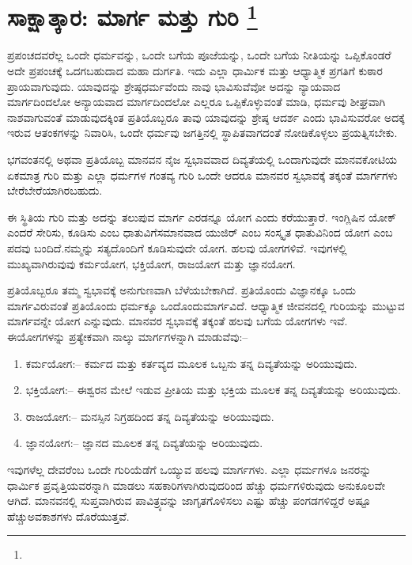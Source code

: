 
\vskip -0.5cm

\chapter[ಸಾಕ್ಷಾತ್ಕಾರ: ಮಾರ್ಗ ಮತ್ತು ಗುರಿ ]{ಸಾಕ್ಷಾತ್ಕಾರ: ಮಾರ್ಗ ಮತ್ತು ಗುರಿ \protect\footnote{}}

ಪ್ರಪಂಚದವರೆಲ್ಲ ಒಂದೇ ಧರ್ಮವನ್ನು, ಒಂದೇ ಬಗೆಯ ಪೂಜೆಯನ್ನು, ಒಂದೇ ಬಗೆಯ ನೀತಿಯನ್ನು ಒಪ್ಪಿಕೊಂಡರೆ ಅದೇ ಪ್ರಪಂಚಕ್ಕೆ ಒದಗಬಹುದಾದ ಮಹಾ ದುರ್ಗತಿ. ಇದು ಎಲ್ಲಾ ಧಾರ್ಮಿಕ ಮತ್ತು ಆಧ್ಯಾತ್ಮಿಕ ಪ್ರಗತಿಗೆ ಕುಠಾರ ಪ್ರಾಯವಾಗುವುದು. ಯಾವುದನ್ನು ಶ್ರೇಷ್ಠಧರ್ಮವೆಂದು ನಾವು ಭಾವಿಸುವೆವೋ ಅದನ್ನು ನ್ಯಾಯವಾದ ಮಾರ್ಗದಿಂದಲೋ ಅನ್ಯಾಯವಾದ ಮಾರ್ಗದಿಂದಲೋ ಎಲ್ಲರೂ ಒಪ್ಪಿಕೊಳ್ಳುವಂತೆ ಮಾಡಿ, ಧರ್ಮವು ಶೀಘ್ರವಾಗಿ ನಾಶವಾಗುವಂತೆ ಮಾಡುವುದಕ್ಕಿಂತ ಪ್ರತಿಯೊಬ್ಬರೂ ತಾವು ಯಾವುದನ್ನು ಶ್ರೇಷ್ಠ ಆದರ್ಶ ಎಂದು ಭಾವಿಸುವರೋ ಅದಕ್ಕೆ ಇರುವ ಆತಂಕಗಳನ್ನು ನಿವಾರಿಸಿ, ಒಂದೇ ಧರ್ಮವು ಜಗತ್ತಿನಲ್ಲಿ ಸ್ಥಾಪಿತವಾಗದಂತೆ ನೋಡಿಕೊಳ್ಳಲು ಪ್ರಯತ್ನಿಸಬೇಕು.

ಭಗವಂತನಲ್ಲಿ ಅಥವಾ ಪ್ರತಿಯೊಬ್ಬ ಮಾನವನ ನೈಜ ಸ್ವಭಾವವಾದ ದಿವ್ಯತೆಯಲ್ಲಿ ಒಂದಾಗುವುದೇ ಮಾನವಕೋಟಿಯ ಏಕಮಾತ್ರ ಗುರಿ ಮತ್ತು ಎಲ್ಲಾ ಧರ್ಮಗಳ ಗಂತವ್ಯ ಗುರಿ ಒಂದೇ ಆದರೂ ಮಾನವರ ಸ್ವಭಾವಕ್ಕೆ ತಕ್ಕಂತೆ ಮಾರ್ಗಗಳು ಬೇರೆಬೇರೆಯಾಗಿರ\-ಬಹುದು.

ಈ ಸ್ಥಿತಿಯ ಗುರಿ ಮತ್ತು ಅದನ್ನು ತಲುಪುವ ಮಾರ್ಗ ಎರಡನ್ನೂ ಯೋಗ ಎಂದು ಕರೆಯುತ್ತಾರೆ. ಇಂಗ್ಲಿಷಿನ ಯೋಕ್​ ಎಂದರೆ ಸೇರಿಸು, ಕೂಡಿಸು ಎಂಬ ಧಾತುವಿಗೆ\break ಸಮಾನವಾದ ಯುಜಿರ್​ ಎಂಬ ಸಂಸ್ಕೃತ ಧಾತುವಿನಿಂದ ಯೋಗ ಎಂಬ ಪದವು ಬಂದಿದೆ.\break ನಮ್ಮನ್ನು ಸತ್ಯದೊಂದಿಗೆ ಕೂಡಿಸುವುದೇ ಯೋಗ. ಹಲವು ಯೋಗಗಳಿವೆ. ಇವುಗಳಲ್ಲಿ ಮುಖ್ಯವಾಗಿರುವುವು ಕರ್ಮಯೋಗ, ಭಕ್ತಿಯೋಗ, ರಾಜಯೋಗ ಮತ್ತು ಜ್ಞಾನಯೋಗ.

ಪ್ರತಿಯೊಬ್ಬರೂ ತಮ್ಮ ಸ್ವಭಾವಕ್ಕೆ ಅನುಗುಣವಾಗಿ ಬೆಳೆಯಬೇಕಾಗಿದೆ. ಪ್ರತಿಯೊಂದು ವಿಜ್ಞಾನಕ್ಕೂ ಒಂದು ಮಾರ್ಗವಿರುವಂತೆ ಪ್ರತಿಯೊಂದು ಧರ್ಮಕ್ಕೂ ಒಂದೊಂದು\break ಮಾರ್ಗವಿದೆ. ಆಧ್ಯಾತ್ಮಿಕ ಜೀವನದಲ್ಲಿ ಗುರಿಯನ್ನು ಮುಟ್ಟುವ ಮಾರ್ಗವನ್ನೇ ಯೋಗ ಎನ್ನುವುದು. ಮಾನವರ ಸ್ವಭಾವಕ್ಕೆ ತಕ್ಕಂತೆ ಹಲವು ಬಗೆಯ ಯೋಗಗಳು ಇವೆ. ಈ\break ಯೋಗಗಳನ್ನು ಪ್ರತ್ಯೇಕವಾಗಿ ನಾಲ್ಕು ಮಾರ್ಗಗಳನ್ನಾಗಿ ಮಾಡುವೆವು:–

\begin{enumerate}
\item ಕರ್ಮಯೋಗ:– ಕರ್ಮದ ಮತ್ತು ಕರ್ತವ್ಯದ ಮೂಲಕ ಒಬ್ಬನು ತನ್ನ ದಿವ್ಯತೆಯನ್ನು ಅರಿಯುವುದು.

 \item ಭಕ್ತಿಯೋಗ:– ಈಶ್ವರನ ಮೇಲೆ ಇಡುವ ಪ್ರೀತಿಯ ಮತ್ತು ಭಕ್ತಿಯ ಮೂಲಕ ತನ್ನ ದಿವ್ಯತೆಯನ್ನು ಅರಿಯುವುದು.

 \item ರಾಜಯೋಗ:– ಮನಸ್ಸಿನ ನಿಗ್ರಹದಿಂದ ತನ್ನ ದಿವ್ಯತೆಯನ್ನು ಅರಿಯುವುದು.

 \item ಜ್ಞಾನಯೋಗ:– ಜ್ಞಾನದ ಮೂಲಕ ತನ್ನ ದಿವ್ಯತೆಯನ್ನು ಅರಿಯುವುದು.

\end{enumerate}

ಇವುಗಳೆಲ್ಲ ದೇವರೆಂಬ ಒಂದೇ ಗುರಿಯೆಡೆಗೆ ಒಯ್ಯುವ ಹಲವು ಮಾರ್ಗಗಳು. ಎಲ್ಲಾ ಧರ್ಮಗಳೂ ಜನರನ್ನು ಧಾರ್ಮಿಕ ಪ್ರವೃತ್ತಿಯವರನ್ನಾಗಿ ಮಾಡಲು ಸಹಕಾರಿಗಳಾಗಿರುವುದರಿಂದ ಹೆಚ್ಚು ಧರ್ಮಗಳಿರುವುದು ಅನುಕೂಲವೇ ಆಗಿದೆ. ಮಾನವನಲ್ಲಿ ಸುಪ್ತವಾಗಿರುವ ಪಾವಿತ್ರ್ಯವನ್ನು ಜಾಗೃತಗೊಳಿಸಲು ಎಷ್ಟು ಹೆಚ್ಚು ಪಂಗಡಗಳಿದ್ದರೆ ಅಷ್ಟೂ ಹೆಚ್ಚು\break ಅವಕಾಶಗಳು ದೊರೆಯುತ್ತವೆ.

